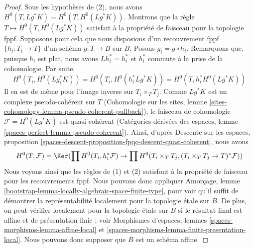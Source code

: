 \begin{proof}
Sous les hypothèses de (2), nous avons
$H^0(T, Lg^*K) = H^0(T, H^0(Lg^*K))$. Montrons que la règle
$T \mapsto H^0(T, H^0(Lg^*K))$ satisfait à la propriété de faisceau pour la
topologie fppf. Supposons pour cela que nous disposions d'un recouvrement fppf
$\{h_i : T_i \to T\}$ d'un schéma $g : T \to B$ sur $B$. Posons
$g_i = g \circ h_i$. Remarquons que, puisque $h_i$ est plat, nous avons
$Lh_i^* = h_i^*$ et $h_i^*$ commute à la prise de la cohomologie. Par suite,
$$
H^0(T_i, H^0(Lg_i^*K)) =
H^0(T_i, H^0(h_i^*Lg^*K)) =
H^0(T, h_i^*H^0(Lg^*K))
$$
Il en est de même pour l'image inverse sur $T_i \times_T T_j$. Comme
$Lg^*K$ est un complexe pseudo-cohérent sur $T$ (Cohomologie sur les sites,
lemme \ref{sites-cohomology-lemma-pseudo-coherent-pullback}), le faisceau de
cohomologie $\mathcal{F} = H^0(Lg^*K)$ est quasi-cohérent (Catégories dérivées
des espaces, lemme \ref{spaces-perfect-lemma-pseudo-coherent}). Ainsi, d'après
Descente sur les espaces, proposition
\ref{spaces-descent-proposition-fpqc-descent-quasi-coherent}, nous avons
$$
H^0(T, \mathcal{F}) = \Ker(
\prod H^0(T_i, h_i^*\mathcal{F}) \to
\prod H^0(T_i \times_T T_j, (T_i \times_T T_j \to T)^*\mathcal{F}))
$$
Nous voyons ainsi que les règles de (1) et (2) satisfont à la propriété de
faisceau pour les recouvrements fppf. Nous pouvons donc appliquer Amorçage,
lemme \ref{bootstrap-lemma-locally-algebraic-space-finite-type}, pour voir
qu'il suffit de démontrer la représentabilité localement pour la topologie
\'etale sur $B$. De plus, on peut vérifier localement pour la topologie \'etale
sur $B$ si le résultat final est affine et de présentation finie ; voir
Morphismes d'espaces, lemmes \ref{spaces-morphisms-lemma-affine-local} et
\ref{spaces-morphisms-lemma-finite-presentation-local}. Nous pouvons donc
supposer que $B$ est un schéma affine.


\end{proof}
